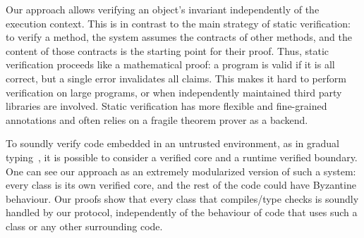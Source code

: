 



\newcommand\sepItems{\saveSpace\saveSpace\saveSpace\\*${}_{}$\\*${}_{}\,\bullet\,$}
%
{}
Our approach allows verifying an object's invariant independently of the execution context.
This is in contrast to the main strategy of static verification: to verify a method, the system assumes the contracts of other methods, and the content of those contracts is the starting point for their proof.
Thus, static verification proceeds like a mathematical proof: a program is valid if it is all correct, but a single error invalidates all claims. This makes it hard to perform verification on large programs, or when independently maintained third party libraries are involved.
 Static verification has more flexible and fine-grained annotations and often relies on a fragile theorem prover as a backend.

To soundly verify code embedded in an untrusted environment, as in gradual typing~\cite{DBLP:conf/oopsla/TakikawaSDTF12,DBLP:conf/popl/WrigstadNLOV10}, it is possible to 
consider a verified core and a runtime verified boundary.
One can see our approach as an extremely modularized	version of such a system: every class is its
own verified core, and the rest of the code could have Byzantine behaviour. Our proofs show that every class that compiles/type checks is 
soundly handled by our protocol, independently of the behaviour of code that uses such a class or any other surrounding code.

